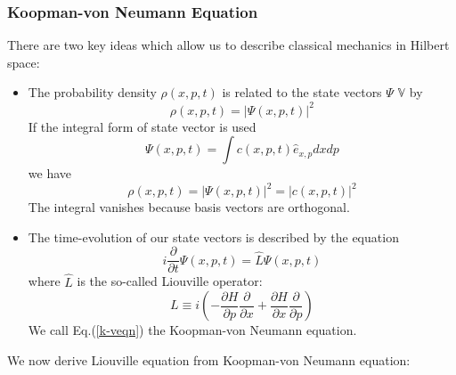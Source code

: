 \subsubsection{Koopman-von Neumann Equation}
There are two key ideas which allow us to describe classical mechanics in Hilbert space:
\begin{qt}
\begin{itemize}
    \item The probability density $\rho(x, p, t)$ is related to the state vectors $\Psi$ $\mathbb{V}$ by $$
\rho(x, p, t)=|\Psi(x, p, t)|^{2}
$$
If the integral form of state vector is used
$$
\Psi(x, p, t)=\int c(x, p, t) \hat{e}_{x, p} d x d p
$$
we have
$$
\rho(x, p, t)=|\Psi(x, p, t)|^{2}=|c(x, p, t)|^{2}
$$
The integral vanishes because basis vectors are orthogonal.
\item The time-evolution of our state vectors is described by the equation
\begin{equation}
i \frac{\partial}{\partial t} \Psi(x, p, t)=\hat{L} \Psi(x, p, t)
\label{k-veqn}
\end{equation}
where $\hat{L}$ is the so-called Liouville operator:
$$
L \equiv i\left(-\frac{\partial H}{\partial p} \frac{\partial}{\partial x}+\frac{\partial H}{\partial x} \frac{\partial}{\partial p}\right)
$$
We call Eq.(\ref{k-veqn}) the Koopman-von Neumann equation.
\end{itemize}
\end{qt}
We now derive Liouville equation from Koopman-von Neumann equation:

